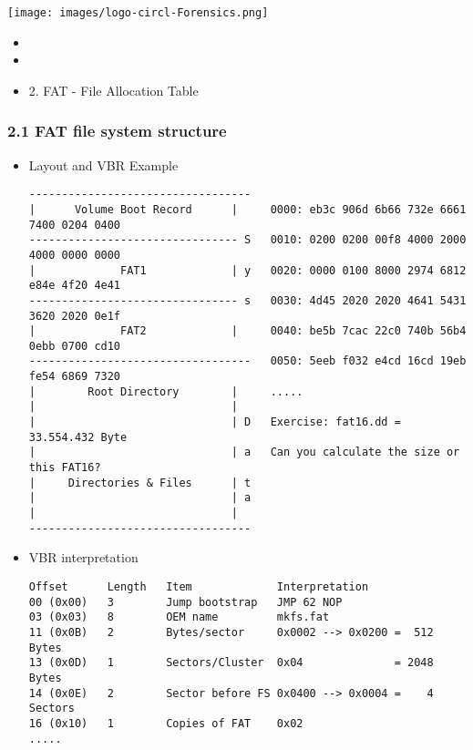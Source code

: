 %
%



\begin{frame}
    \texttt{[image: images/logo-circl-Forensics.png]}
    \begin{itemize}
        \item[]
        \item[]
        \item[] 2. FAT - File Allocation Table
    \end{itemize}
\end{frame}


\begin{frame}[fragile]
  \frametitle{2.1 FAT file system structure}
    \begin{itemize}
	    \item Layout and VBR Example
  \begin{lstlisting}[basicstyle=\tiny]
----------------------------------
|      Volume Boot Record      |     0000: eb3c 906d 6b66 732e 6661 7400 0204 0400
-------------------------------- S   0010: 0200 0200 00f8 4000 2000 4000 0000 0000
|             FAT1             | y   0020: 0000 0100 8000 2974 6812 e84e 4f20 4e41
-------------------------------- s   0030: 4d45 2020 2020 4641 5431 3620 2020 0e1f
|             FAT2             |     0040: be5b 7cac 22c0 740b 56b4 0ebb 0700 cd10
----------------------------------   0050: 5eeb f032 e4cd 16cd 19eb fe54 6869 7320
|        Root Directory        |     .....
|                              |
|                              | D   Exercise: fat16.dd = 33.554.432 Byte
|                              | a   Can you calculate the size or this FAT16?
|     Directories & Files      | t
|                              | a
|                              | 
----------------------------------
  \end{lstlisting}
	    \item VBR interpretation
  \begin{lstlisting}[basicstyle=\tiny]
Offset      Length   Item             Interpretation
00 (0x00)   3        Jump bootstrap   JMP 62 NOP
03 (0x03)   8        OEM name         mkfs.fat
11 (0x0B)   2        Bytes/sector     0x0002 --> 0x0200 =  512 Bytes
13 (0x0D)   1        Sectors/Cluster  0x04              = 2048 Bytes
14 (0x0E)   2        Sector before FS 0x0400 --> 0x0004 =    4 Sectors
16 (0x10)   1        Copies of FAT    0x02
.....
  \end{lstlisting}
    \end{itemize}
\end{frame}


